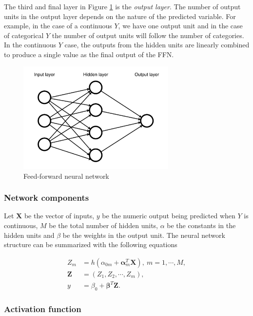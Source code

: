 \documentclass[12pt]{article}
\begin{document}
The third and final layer in Figure \ref{fig:feedforward}
is the \emph{output layer}. The number of output units in the
output layer depends on the nature of the predicted
variable. For example, in the case of a continuous \(Y\), we
have one output unit and in the case of categorical \(Y\) the
number of output units will follow the number of categories.
In the continuous \(Y\) case, the
outputs from the hidden units are linearly combined to
produce a single value as the final output of the FFN.

\begin{figure}
\centering
\includegraphics[width=0.7\textwidth,height=\textheight]{./src/feedforward}
\caption{\label{fig:feedforward} Feed-forward neural network}
\end{figure}

\hypertarget{network-components}{%
\subsubsection{Network components}\label{network-components}}

Let \(\mathbf{X}\) be the vector of inputs, \(y\) be the numeric
output being predicted when \(Y\) is continuous, \(M\) be the
total number of hidden units, \(\alpha\) be the constants in the
hidden units and \(\beta\) be the weights in the output unit.
The neural network structure can be summarized with the
following equations

\begin{align*}
    Z_m &= h(\alpha_{0m} + \mathbf{\alpha}^T_m\mathbf{X}), ~m
    = 1, \cdots, M,\\
    \mathbf{Z} &= (Z_1, Z_2, \cdots, Z_m),\\
    y &= \beta_{0} + \mathbf{\beta}^T \mathbf{Z}.
\end{align*}

\hypertarget{activation-function}{%
\subsubsection{Activation function}\label{activation-function}}
\end{document}
